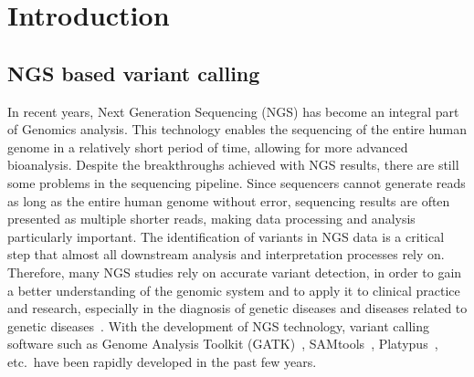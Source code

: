 \documentclass[PhD]{PHlab-thesis}
\begin{document}

\printnomenclature[5cm]

\newpage
\setcounter{page}{1}



\chapter{Introduction}
\section{NGS based variant calling}
In recent years, Next Generation Sequencing (NGS) has become an integral part of Genomics analysis. This technology enables the sequencing of the entire human genome in a relatively short period of time, allowing for more advanced bioanalysis. Despite the breakthroughs achieved with NGS results, there are still some problems in the sequencing pipeline. Since sequencers cannot generate reads as long as the entire human genome without error, sequencing results are often presented as multiple shorter reads, making data processing and analysis particularly important. The identification of variants in NGS data is a critical step that almost all downstream analysis and interpretation processes rely on. Therefore, many NGS studies rely on accurate variant detection, in order to gain a better understanding of the genomic system and to apply it to clinical practice and research, especially in the diagnosis of genetic diseases and diseases related to genetic diseases~\cite{Shashi2014NGS, Stenson2017NGS}. With the development of NGS technology, variant calling software such as Genome Analysis Toolkit (GATK)~\cite{McKenna2010GATK}, SAMtools~\cite{li2009SAMtools}, Platypus~\cite{Rimmer2014Platypus}, etc.\ have been rapidly developed in the past few years.
\end{document}
